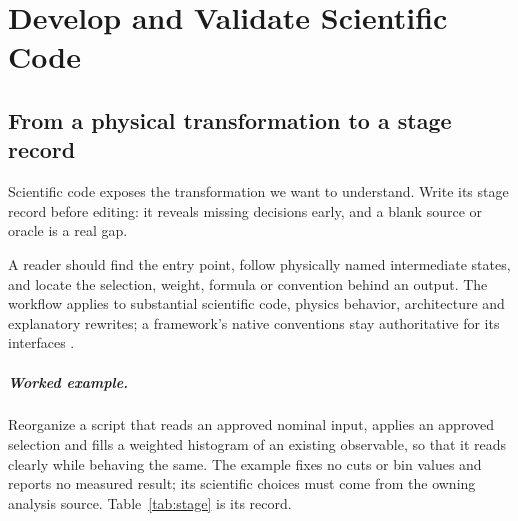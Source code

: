\chapter{Develop and Validate Scientific Code}\label{ch:code}
\section{From a physical transformation to a stage record}

\begin{headline}
  Scientific code exposes the transformation we want to understand. Write its stage
  record before editing: it reveals missing decisions early, and a blank source or oracle is
  a real gap.
\end{headline}

A reader should find the entry point, follow physically named intermediate states, and
locate the selection, weight, formula or convention behind an output. The workflow
applies to substantial scientific code, physics behavior, architecture and explanatory
rewrites; a framework's native conventions stay authoritative for its interfaces
\cite[Scientific coding; Expose the procedure]{skill:coding}.

\paragraph{Worked example.} Reorganize a script that reads an approved nominal input,
applies an approved selection and fills a weighted histogram of an existing observable, so
that it reads clearly while behaving the same. The example fixes no cuts or bin values and
reports no measured result; its scientific choices must come from the owning analysis source.
Table~\ref{tab:stage} is its record.

